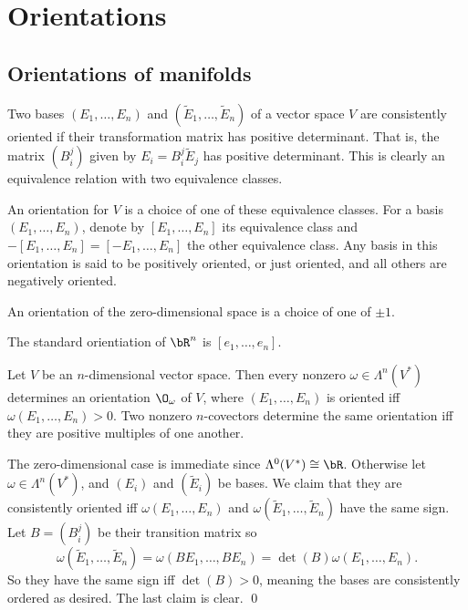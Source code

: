 \section{Orientations}

\subsection{Orientations of manifolds}

\bdefn

    Two bases $(E_1,\dots,E_n)$ and $(\tilde E_1,\dots,\tilde E_n)$ of a vector space $V$ are {\emphcolor consistently oriented} if their transformation matrix has
    positive determinant.
    That is, the matrix $(B^j_i)$ given by $E_i=B^j_i\tilde E_j$ has positive determinant.
    This is clearly an equivalence relation with two equivalence classes.

    An {\emphcolor orientation} for $V$ is a choice of one of these equivalence classes.
    For a basis $(E_1,\dots,E_n)$, denote by $[E_1,\dots,E_n]$ its equivalence class and $-[E_1,\dots,E_n]=[-E_1,\dots,E_n]$ the other equivalence class.
    Any basis in this orientation is said to be {\emphcolor positively oriented}, or just {\emphcolor oriented}, and all others are {\emphcolor negatively oriented}.

    An orientation of the zero-dimensional space is a choice of one of $\pm1$.

\edefn

\bexam

    The {\emphcolor standard orientiation} of $\bR^n$ is $[e_1,\dots,e_n]$.

\eexam

\bprop

    Let $V$ be an $n$-dimensional vector space.
    Then every nonzero $\omega\in\Lambda^n(V^*)$ determines an orientation $\O_\omega$ of $V$, where $(E_1,\dots,E_n)$ is oriented iff $\omega(E_1,\dots,E_n)>0$.
    Two nonzero $n$-covectors determine the same orientation iff they are positive multiples of one another.

\eprop

\bproof

    The zero-dimensional case is immediate since $\Lambda^0(V^*)\cong\bR$.
    Otherwise let $\omega\in\Lambda^n(V^*)$, and $(E_i)$ and $(\tilde E_i)$ be bases.
    We claim that they are consistently oriented iff $\omega(E_1,\dots,E_n)$ and $\omega(\tilde E_1,\dots,\tilde E_n)$ have the same sign.
    Let $B=(B^j_i)$ be their transition matrix so
    $$ \omega(\tilde E_1,\dots,\tilde E_n) = \omega(BE_1,\dots,BE_n) = \det(B)\omega(E_1,\dots,E_n) . $$
    So they have the same sign iff $\det(B)>0$, meaning the bases are consistently ordered as desired.
    The last claim is clear.
    \qed

